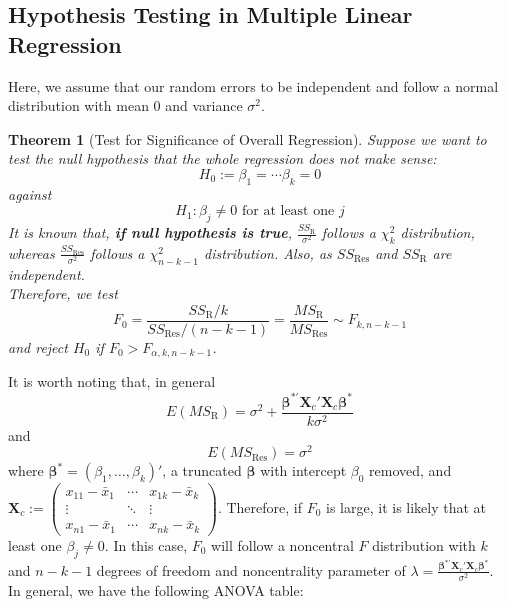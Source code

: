 \documentclass[11pt]{article}
\newtheorem{theorem}{Theorem}[section]
\theoremstyle{definition}
\begin{document}
\subsection{Hypothesis Testing in Multiple Linear Regression}
Here, we assume that our random errors to be independent and follow a normal distribution with mean $0$ and variance $\sigma^2$.
\begin{theorem}[Test for Significance of Overall Regression]
\normalfont Suppose we want to test the null hypothesis that the whole regression does not make sense:
\[
H_0:=\beta_1=\cdots\beta_k=0
\]
against 
\[
H_1:\beta_j\neq 0\text{ for at least one }j
\]
It is known that, \textbf{if null hypothesis is true}, $\frac{SS_\text{R}}{\sigma^2}$ follows a $\chi_k^2$ distribution, whereas $\frac{SS_\text{Res}}{\sigma^2}$ follows a $\chi^2_{n-k-1}$ distribution. Also, as $SS_\text{Res}$ and $SS_\text{R}$ are independent.\\
Therefore, we test
\[
F_0=\frac{SS_\text{R}/k}{SS_\text{Res}/(n-k-1)}=\frac{MS_\text{R}}{MS_\text{Res}}\sim F_{k,n-k-1}
\]
and reject $H_0$ if $F_0>F_{\alpha, k, n-k-1}$.
\end{theorem}
It is worth noting that, in general
\[
E(MS_\text{R})=\sigma^2 +\frac{\bm{\beta}^{\ast\prime}\bm{X}_c' \bm{X}_c \bm{\beta}^{\ast}}{k\sigma^2}
\]
and
\[
E(MS_\text{Res})=\sigma^2
\]
where $\bm{\beta}^\ast=(\beta_1,\ldots, \beta_k)'$, a truncated $\bm{\beta}$ with intercept $\beta_0$ removed, and $\bm{X}_c:=\begin{pmatrix}x_{11}-\bar{x}_1&\cdots&x_{1k}-\bar{x}_k\\\vdots&\ddots&\vdots\\x_{n1}-\bar{x}_1&\cdots&x_{nk}-\bar{x}_k\end{pmatrix}$.
Therefore, if $F_0$ is large, it is likely that at least one $\beta_j\neq 0$. In this case, $F_0$ will follow a noncentral $F$ distribution with $k$ and $n-k-1$ degrees of freedom and noncentrality parameter of $\lambda = \frac{\bm{\beta}^{\ast\prime}\bm{X}_c'\bm{X}_c\bm{\beta}^\ast}{\sigma^2}$.\\
In general, we have the following ANOVA table:
\end{document}

